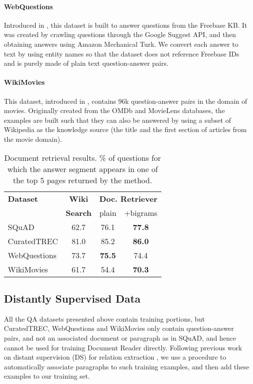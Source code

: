 \documentclass[11pt,a4paper]{article}
\newcommand\squad{SQuAD\xspace}
\newcommand\curq{CuratedTREC-S\xspace}
\newcommand\lcurq{CuratedTREC\xspace}
\newcommand\wikim{WikiMovies\xspace}
\newcommand\wq{WebQuestions\xspace}
\newcommand\us{DrQA\xspace}
\newcommand\usp{Document Reader\xspace}
\begin{document}
\paragraph{\wq} Introduced in \cite{berant2013semantic}, this dataset is built to answer questions from the Freebase KB. It was created by crawling questions through the Google Suggest API, and then obtaining answers using Amazon Mechanical Turk.
%
We convert each answer to text by using entity names so that the dataset does not reference Freebase IDs and is purely made of plain text question-answer pairs.

\paragraph{\wikim} This dataset, introduced in \cite{miller2016key}, contains 96k question-answer pairs in the domain of movies. Originally created from the OMDb and MovieLens databases, the examples are built such that they can also be answered by using a subset of Wikipedia as the knowledge source (the title and the first section of articles from the movie domain).

\begin{table}[t]
\begin{center}
\normalsize
\begin{tabular}{l|c|cc}
\hline
\bf Dataset &  \bf Wiki & \multicolumn{2}{c}{\bf Doc. Retriever} \\
&  \bf Search  & plain &  +bigrams  \\
\hline
\squad & 62.7 &  76.1 & \bf 77.8 \\
\lcurq & 81.0 & 85.2 & \bf 86.0 \\
\wq &    73.7 & \bf 75.5 & 74.4 \\
\wikim & 61.7 &  54.4 &  \bf 70.3 \\
\hline
\end{tabular}
\end{center}
\caption{\label{tab:ir-res} Document retrieval results. \% of questions for which the answer segment appears in one of the top 5 pages returned by the method. }
\end{table}


\subsection{Distantly Supervised Data} \label{sec:ds}

All the QA datasets presented above contain training portions, but CuratedTREC, WebQuestions
and WikiMovies only contain question-answer pairs, and not
an associated document or paragraph as in SQuAD, and hence
cannot be used for training \usp directly.
%
%
Following previous work on distant supervision (DS) for relation extraction \cite{mintz2009distant}, we use a procedure to automatically associate paragraphs to such training examples, and then add these examples to our
training set.
\end{document}
